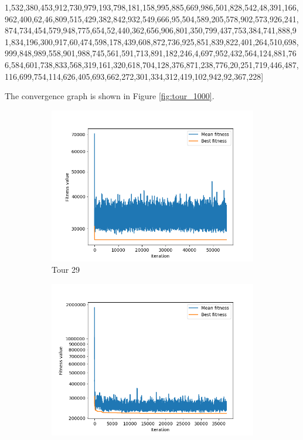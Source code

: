 \documentclass[a4paper,10pt]{article}
\begin{document}
1,532,380,453,912,730,979,193,798,181,158,995,885,669,986,501,828,542,48,391,166,962,400,62,46,809,515,429,382,842,932,549,666,95,504,589,205,578,902,573,926,241,874,734,454,579,948,775,654,52,440,362,656,906,801,350,799,437,753,384,741,888,91,834,196,300,917,60,474,598,178,439,608,872,736,925,851,839,822,401,264,510,698,999,848,989,558,901,988,745,561,591,713,891,182,246,4,697,952,432,564,124,881,766,584,601,738,833,568,319,161,320,618,704,128,376,871,238,776,20,251,719,446,487,116,699,754,114,626,405,693,662,272,301,334,312,419,102,942,92,367,228]

The convergence graph is shown in Figure \ref{fig:tour_1000}.


\begin{figure}[H]
    \centering
    \begin{subfigure}[b]{0.40\linewidth}
      \includegraphics[width=\linewidth]{tour_29_28_12_2021_21_10.png}
      \caption[b]{Tour 29}
      \label{fig:tour_29}
    \end{subfigure}
    \begin{subfigure}[b]{0.40\linewidth}
          \includegraphics[width=\linewidth]{tour_100_28_12_2021_20_00.png}

\end{subfigure}
\end{figure}
\end{document}
